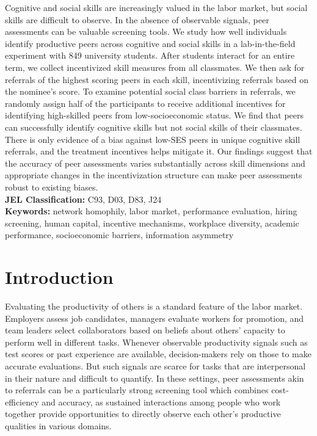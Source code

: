 \documentclass[11pt,a4paper,oneside]{article}
\begin{document}
Cognitive and social skills are increasingly valued in the labor market, but social skills are difficult to observe. In the absence of observable signals, peer assessments can be valuable screening tools. We study how well individuals identify productive peers across cognitive and social skills in a lab-in-the-field experiment with 849 university students. After students interact for an entire term, we collect incentivized skill measures from all classmates. We then ask for referrals of the highest scoring peers in each skill,  incentivizing referrals based on the nominee's score. To examine potential social class barriers in referrals, we randomly assign half of the participants to receive additional incentives for identifying high-skilled peers from low-socioeconomic status. We find that peers can successfully identify cognitive skills but not social skills of their classmates. There is only evidence of a bias against low-SES peers in unique cognitive skill referrals, and the treatment incentives helps mitigate it. Our findings suggest that the accuracy of peer assessments varies substantially across skill dimensions and appropriate changes in the incentivization structure can make peer assessments robust to existing biases. 
\medskip \\
\textbf{JEL Classification:} C93, D03, D83, J24 \\
\textbf{Keywords:} network homophily, labor market, performance evaluation, hiring screening, human capital, incentive mechanisms, workplace diversity, academic performance, socioeconomic barriers, information asymmetry

\section{Introduction}
Evaluating the productivity of others is a standard feature of the labor market. Employers assess job candidates, managers evaluate workers for promotion, and team leaders select collaborators based on beliefs about others' capacity to perform well in different tasks. Whenever observable productivity signals such as test scores or past experience are available, decision-makers rely on those to make accurate evaluations. But such signals are scarce for tasks that are interpersonal in their nature and difficult to quantify. In these settings, peer assessments akin to referrals can be a particularly strong screening tool which combines cost-efficiency and accuracy, as sustained interactions among people who work together provide opportunities to directly observe each other's productive qualities in various domains.
\end{document}
